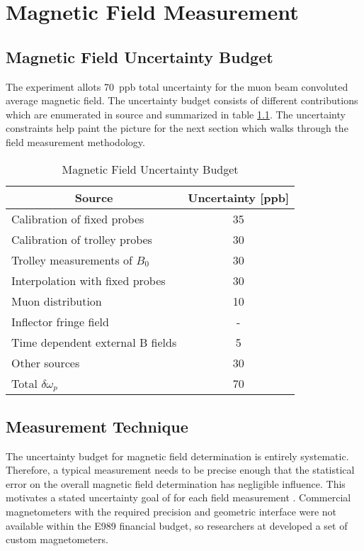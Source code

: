 \chapter{Magnetic Field Measurement} \label{ch:field}

\section{Magnetic Field Uncertainty Budget}

The \mugmtwo experiment allots \SI{70}{ppb} total uncertainty for the muon beam convoluted average magnetic field.  The uncertainty budget consists of different contributions which are enumerated in source \cite{e989-tdr} and summarized in table \ref{tab:field-uncertainties}.  The uncertainty constraints help paint the picture for the next section which walks through the field measurement methodology.

\begin{table}[h]
\label{tab:field-uncertainties}
\caption{Magnetic Field Uncertainty Budget}
\centering
\begin{tabular}{l c}
    \hline
    \multicolumn{1}{c}{Source} & Uncertainty [ppb] \\
    \hline
    Calibration of fixed probes      & 35 \\
    Calibration of trolley probes    & 30 \\
    Trolley measurements of $B_0$    & 30 \\
    Interpolation with fixed probes  & 30 \\
    Muon distribution                & 10 \\
    Inflector fringe field           & -  \\
    Time dependent external B fields & 5  \\
    Other sources                    & 30 \\
    \hline
    Total $\delta \omega_p$          & 70 \\
    \hline
\end{tabular}
\end{table}

\section{Measurement Technique} \label{sec:field-measurement-technique}

The uncertainty budget for magnetic field determination is entirely systematic.  Therefore, a typical measurement needs to be precise enough that the statistical error on the overall magnetic field determination has negligible influence.  This motivates a stated uncertainty goal of  for each field measurement \cite{e989-tdr}.  Commercial magnetometers with the required precision and geometric interface were not available within the E989 financial budget, so researchers at \uw developed a set of custom magnetometers.

